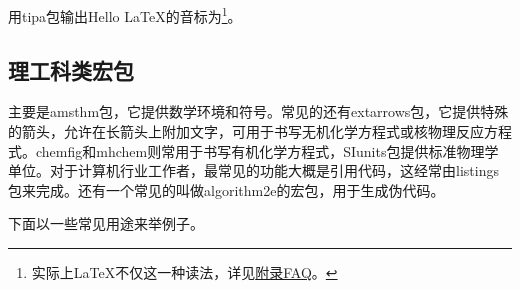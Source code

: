 用tipa包输出Hello \LaTeX 的音标为\footnote{实际上\LaTeX 不仅这一种读法，详见\hyperref[FAQ]{附录FAQ}。}。

\subsection{理工科类宏包}

\renewcommand{\thefootnote}{[\arabic{footnote}]} %

主要是amsthm包，它提供数学环境和符号。常见的还有extarrows包，它提供特殊的箭头，允许在长箭头上附加文字，可用于书写无机化学方程式或核物理反应方程式。chemfig和mhchem则常用于书写有机化学方程式，SIunits包提供标准物理学单位。对于计算机行业工作者，最常见的功能大概是引用代码，这经常由listings包来完成。还有一个常见的叫做algorithm2e的宏包，用于生成伪代码。

下面以一些常见用途来举例子。

